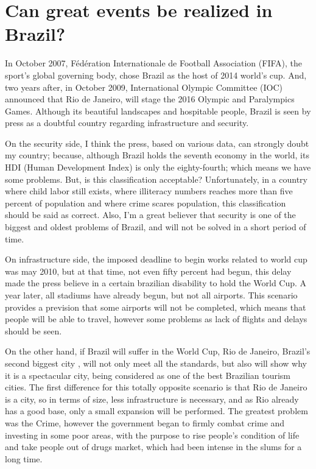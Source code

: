 \documentclass[a4paper,12pt]{article}
\begin{document}
\titleTMB 
\newpage
{} %

\section*{Can great events be realized in Brazil?}


In October 2007, Fédération Internationale de Football Association (FIFA), the
sport's global governing body, chose Brazil as the host of 2014 world's cup.
And, two years after, in October 2009, International Olympic Committee (IOC)
announced  that Rio de Janeiro,  will stage  the 2016  Olympic  and Paralympics
Games.  
Although its beautiful landscapes and hospitable people,
Brazil  is seen  by press  as a  doubtful country  regarding  infrastructure and
security.

On the security side, I think the press, based on various data, can strongly doubt my country;
because, although Brazil holds the seventh economy in the world, its HDI (Human
Development Index) is only the eighty-fourth; which means we have some problems.
But, is this  classification acceptable? Unfortunately, in a  country where child
labor still exists, where illiteracy numbers
reaches more  than five percent of  population and  where crime scares
population, this  classification should  be said as  correct. Also, I'm  a great
believer that security is one of  the biggest and oldest problems of Brazil, and
will not be solved in a short period of time.


On infrastructure side, the imposed deadline to begin works related to
world cup was may 2010, but at that time, not even fifty percent had begun, this
delay made the press believe in a certain brazilian disability to hold the World
Cup. A year later, all stadiums have already begun, but not all airports. 
This scenario  provides a  prevision that some  airports will not  be completed,
which means that people will be able to travel, however some problems as lack of
flights and delays should be seen.

On the  other hand,  if Brazil  will suffer in  the World  Cup, Rio  de Janeiro,
Brazil's second  biggest city , will not  only meet all the  standards, but also
will show why it is a spectacular city, being considered as one of the best Brazilian tourism cities.
The first  difference for this totally opposite scenario is that Rio de
Janeiro is a city, so in terms of size, less infrastructure is necessary, and
as Rio already has  a good base, only a small expansion  will be performed.  The
greatest problem  was the Crime, however  the government began  to firmly combat
crime  and investing  in some  poor  areas, with  the purpose  to rise  people's
condition of life and take people out of drugs market, which had been intense in the slums for a long time.
\end{document}
